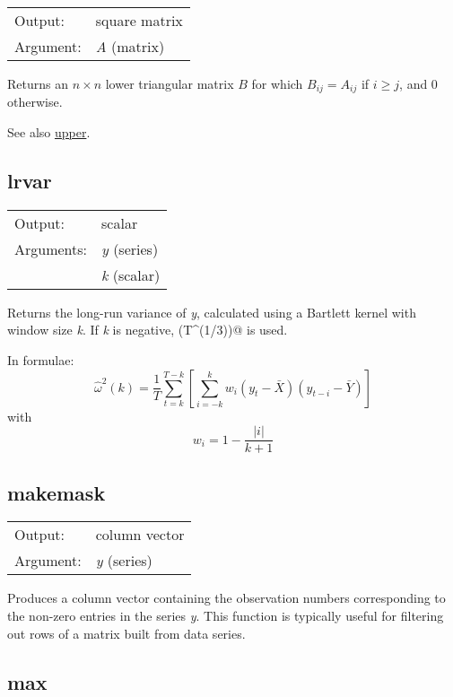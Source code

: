\begin{tabular}{ll}
Output:     & square matrix\\
Argument:   & \textsl{A} (matrix)\\
\end{tabular}

	  Returns an $n\times n$ lower triangular matrix \ensuremath{B}
	  for which $B_{ij} = A_{ij}$ if $i \ge j$, and 0 otherwise.

	  See also \hyperlink{func-upper}{upper}.

\subsection{lrvar}
\hypertarget{func-lrvar}{}

\begin{tabular}{ll}
Output:     & scalar\\
Arguments:  & \textsl{y} (series)\\
           & \textsl{k} (scalar)\\
\end{tabular}

	  Returns the long-run variance of \textsl{y},
	  calculated using a Bartlett kernel with window size
	  \textsl{k}. If \textsl{k} is
	  negative, \verb@int(T^(1/3))@ is used.

	  In formulae: 
	  \[ \hat{\omega}^2(k) = \frac{1}{T} \sum_{t=k}^{T-k}
	  \left[ \sum_{i=-k}^k w_i (y_t - \bar{X}) (y_{t-i} - \bar{Y})
	  \right] \] 
	  with 
	  \[ w_i = 1 - \frac{|i|}{k + 1} \]

\subsection{makemask}
\hypertarget{func-makemask}{}

\begin{tabular}{ll}
Output:     & column vector\\
Argument:   & \textsl{y} (series)\\
\end{tabular}

	  Produces a column vector containing the observation numbers
	  corresponding to the non-zero entries in the series
	  \textsl{y}. This function is typically useful for
	  filtering out rows of a matrix built from data series.

\subsection{max}
\hypertarget{func-max}{}

